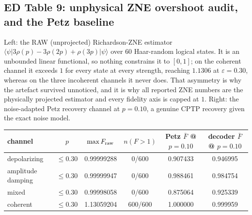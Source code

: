 \documentclass[10pt,a4paper]{article}
\begin{document}
\subsection*{ED Table 9: unphysical ZNE overshoot audit, and the Petz baseline}
Left: the RAW (unprojected) Richardson-ZNE estimator
$\langle\psi|3\rho(p)-3\rho(2p)+\rho(3p)|\psi\rangle$ over $60$ Haar-random
logical states. It is an unbounded linear functional, so nothing constrains it to
$[0,1]$; on the coherent channel it exceeds $1$ for every state at every strength,
reaching $1.1306$ at $\varepsilon=0.30$, whereas on the three incoherent channels
it never does. That asymmetry is why the artefact survived unnoticed, and it is
why all reported ZNE numbers are the physically projected estimator and every
fidelity axis is capped at $1$. Right: the noise-adapted Petz recovery channel at
$p=0.10$, a genuine CPTP recovery given the exact noise model.
\begin{longtable}{lccc|cc}
\toprule channel & $p$ & $\max F_{\rm raw}$ & $n(F>1)$ & Petz $\bar F$ @ $p{=}0.10$ & decoder $\bar F$ @ $p{=}0.10$ \\ \midrule
depolarizing & $\le0.30$ & 0.99999288 & 0/600 & 0.907433 & 0.946995 \\
amplitude damping & $\le0.30$ & 0.99999947 & 0/600 & 0.988461 & 0.984754 \\
mixed & $\le0.30$ & 0.99998058 & 0/600 & 0.875064 & 0.925339 \\
coherent & $\le0.30$ & 1.13059204 & 600/600 & 1.000000 & 0.999959 \\
\bottomrule\end{longtable}
\end{document}

